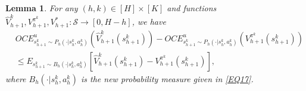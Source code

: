\documentclass[11pt]{article}
\newtheorem{lemma}{Lemma}
\newcommand{\1}{\mathbbm{1}}
\begin{document}
\begin{lemma}\label{L6}
For any $(h,k)\in [H]\times [K]$ and functions $\hat{V}_{h+1}^k,V_{h+1}^{\pi^k},V_{h+1}^{*}:\mathcal{S}\to [0,H-h]$, we have
\begin{equation}\label{EQ18}
\begin{aligned}
&OCE^{u}_{s_{h+1}^k\sim P_h(\cdot\vert s_h^k,a_h^k)}\left (\hat{V}_{h+1}^k(s_{h+1}^k)\right )-OCE^{u}_{s_{h+1}^k\sim P_h(\cdot\vert s_h^k,a_h^k)}\left (V_{h+1}^{\pi^k}(s_{h+1}^k)\right )\\
&\leq E_{s_{h+1}^k\sim B_h(\cdot\vert s_h^k,a_h^k)}\left [\hat{V}_{h+1}^k(s_{h+1}^k)-V_{h+1}^{\pi^k}(s_{h+1}^k)\right ],
\end{aligned}
\end{equation}
where $B_h(\cdot\vert s_h^k,a_h^k)$ is the new probability measure given in \eqref{EQ17}.
\end{lemma}
\end{document}
